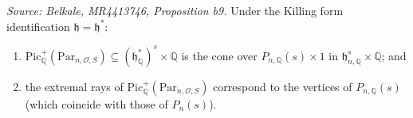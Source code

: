 \begin{proposition}[B9]
  \label{prop:b9}
  \textit{Source: Belkale, MR4413746, Proposition b9.}
  Under the Killing form identification \(\mathfrak{h} = \mathfrak{h}^*\):
  \begin{enumerate}
    \item \(\mathrm{Pic}^+_\mathbb{Q}(\mathrm{Par}_{n,\mathcal{O},S}) \subseteq (\mathfrak{h}^*_\mathbb{Q})^s \times \mathbb{Q}\) is the cone over \(P_{n,\mathbb{Q}}(s) \times 1\) in \(\mathfrak{h}^s_{n,\mathbb{Q}} \times \mathbb{Q}\); and
    \item the extremal rays of \(\mathrm{Pic}^+_\mathbb{Q}(\mathrm{Par}_{n,\mathcal{O},S})\) correspond to the vertices of \(P_{n,\mathbb{Q}}(s)\) (which coincide with those of \(P_n(s)\)).
  \end{enumerate}
\end{proposition}

